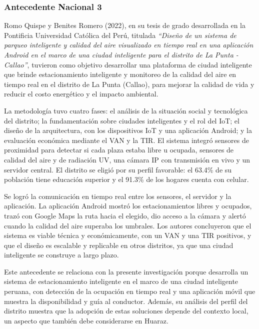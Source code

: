 \documentclass[12pt,a4paper]{article}
\begin{document}
\subsubsection{Antecedente Nacional 3}

Romo Quispe y Benites Romero (2022), en su tesis de grado desarrollada en la Pontificia Universidad Católica del Perú, titulada \textit{``Diseño de un sistema de parqueo inteligente y calidad del aire visualizado en tiempo real en una aplicación Android en el marco de una ciudad inteligente para el distrito de La Punta - Callao''}, tuvieron como objetivo desarrollar una plataforma de ciudad inteligente que brinde estacionamiento inteligente y monitoreo de la calidad del aire en tiempo real en el distrito de La Punta (Callao), para mejorar la calidad de vida y reducir el costo energético y el impacto ambiental.

La metodología tuvo cuatro fases: el análisis de la situación social y tecnológica del distrito; la fundamentación sobre ciudades inteligentes y el rol del IoT; el diseño de la arquitectura, con los dispositivos IoT y una aplicación Android; y la evaluación económica mediante el VAN y la TIR. El sistema integró sensores de proximidad para detectar si cada plaza estaba libre u ocupada, sensores de calidad del aire y de radiación UV, una cámara IP con transmisión en vivo y un servidor central. El distrito se eligió por su perfil favorable: el 63.4\% de su población tiene educación superior y el 91.3\% de los hogares cuenta con celular.

Se logró la comunicación en tiempo real entre los sensores, el servidor y la aplicación. La aplicación Android mostró los estacionamientos libres y ocupados, trazó con Google Maps la ruta hacia el elegido, dio acceso a la cámara y alertó cuando la calidad del aire superaba los umbrales. Los autores concluyeron que el sistema es viable técnica y económicamente, con un VAN y una TIR positivos, y que el diseño es escalable y replicable en otros distritos, ya que una ciudad inteligente se construye a largo plazo.

Este antecedente se relaciona con la presente investigación porque desarrolla un sistema de estacionamiento inteligente en el marco de una ciudad inteligente peruana, con detección de la ocupación en tiempo real y una aplicación móvil que muestra la disponibilidad y guía al conductor. Además, su análisis del perfil del distrito muestra que la adopción de estas soluciones depende del contexto local, un aspecto que también debe considerarse en Huaraz.
\end{document}
